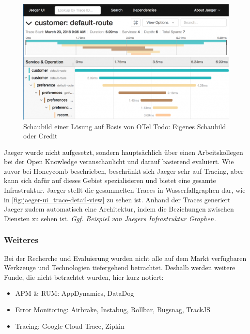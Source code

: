 \begin{figure}
\centering
\vspace{-\baselineskip}
\includegraphics[width=\linewidth]{img/03_methoden/redhat_jaeger-ui_trace-detail-view.png}
\caption{Schaubild einer Lösung auf Basis von OTel {\color{red}Todo: Eigenes Schaubild oder Credit}}
\label{fig:jaeger-ui_trace-detail-view}
\end{figure}

Jaeger wurde nicht aufgesetzt, sondern hauptsächlich über einen Arbeitskollegen bei der Open Knowledge veranschaulicht und darauf basierend evaluiert. Wie zuvor bei Honeycomb beschrieben, beschränkt sich Jaeger sehr auf Tracing, aber kann sich dafür auf dieses Gebiet spezialisieren und bietet eine gesamte Infrastruktur. Jaeger stellt die gesammelten Traces in Wasserfallgraphen dar, wie in \autoref{fig:jaeger-ui_trace-detail-view} zu sehen ist. Anhand der Traces generiert Jaeger zudem automatisch eine Architektur, indem die Beziehungen zwischen Diensten zu sehen ist. \textit{\color{red}Ggf. Beispiel von Jaegers Infrastruktur Graphen.}

\subsubsection{Weiteres}
\label{sec:weitere-werkzeuge}

Bei der Recherche und Evaluierung wurden nicht alle auf dem Markt verfügbaren Werkzeuge und Technologien tiefergehend betrachtet. Deshalb werden weitere Funde, die nicht betrachtet wurden, hier kurz notiert:

\begin{itemize}
	\item APM \& RUM: AppDynamics, DataDog
	\item Error Monitoring: Airbrake, Instabug, Rollbar, Bugsnag, TrackJS
	\item Tracing: Google Cloud Trace, Zipkin
\end{itemize}

